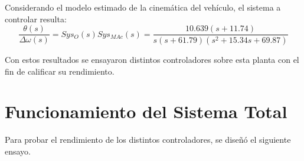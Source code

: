 \documentclass[10pt,conference,a4paper,onecolumn]{article}%
\begin{document}
Considerando el modelo estimado de la cinemática del vehículo, el sistema a controlar resulta:
\begin{equation}
\frac{\theta(s)}{\Delta \omega(s)}=Sys_O(s)Sys_{MAc}(s)=\frac{10.639 (s+11.74)}{s (s+61.79) (s^2 + 15.34s + 69.87)}
\end{equation}

Con estos resultados se ensayaron distintos controladores sobre esta planta con el fin de calificar su rendimiento.


\section{Funcionamiento del Sistema Total}
\label{sec:resultados}
Para probar el rendimiento de los distintos controladores, se diseñó el siguiente ensayo.
\end{document}
